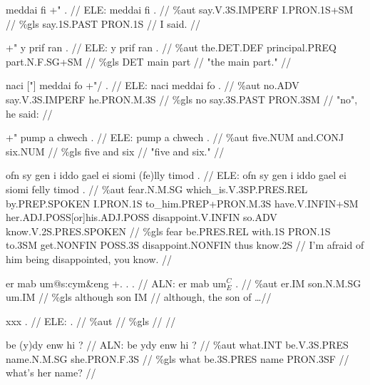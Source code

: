 \documentclass[a4paper,10pt]{article}
\begin{document}
\ex
\begingl[lingstyle=gergl]
\glchat meddai fi +" . //
\glsurface ELE:  meddai fi .  //
\glauto \%aut  say{\scriptsize .V.3S.IMPERF} I{\scriptsize .PRON.1S+SM}   //
\glmanual \%gls  say{\scriptsize .1S.PAST} PRON{\scriptsize .1S}   //
\gleng I said. //
\endgl
\xe

\ex
\begingl[lingstyle=gergl]
\glchat +" y prif ran . //
\glsurface ELE:  y prif ran .  //
\glauto \%aut  the{\scriptsize .DET.DEF} principal{\scriptsize .PREQ} part{\scriptsize .N.F.SG+SM}   //
\glmanual \%gls  DET main part   //
\gleng "the main part." //
\endgl
\xe

\ex
\begingl[lingstyle=gergl]
\glchat naci ["] meddai fo +"/ . //
\glsurface ELE:  naci meddai fo .  //
\glauto \%aut  no{\scriptsize .ADV} say{\scriptsize .V.3S.IMPERF} he{\scriptsize .PRON.M.3S}   //
\glmanual \%gls  no say{\scriptsize .3S.PAST} PRON{\scriptsize .3SM}   //
\gleng "no", he said: //
\endgl
\xe

\ex
\begingl[lingstyle=gergl]
\glchat +" pump a chwech . //
\glsurface ELE:  pump a chwech .  //
\glauto \%aut  five{\scriptsize .NUM} and{\scriptsize .CONJ} six{\scriptsize .NUM}   //
\glmanual \%gls  five and six   //
\gleng "five and six." //
\endgl
\xe

\ex
\begingl[lingstyle=gergl]
\glchat ofn sy gen i iddo gael ei siomi (fe)lly timod . //
\glsurface ELE:  ofn sy gen i iddo gael ei siomi felly timod .  //
\glauto \%aut  fear{\scriptsize .N.M.SG} which\_is{\scriptsize .V.3SP.PRES.REL} by{\scriptsize .PREP.SPOKEN} I{\scriptsize .PRON.1S} to\_him{\scriptsize .PREP+PRON.M.3S} have{\scriptsize .V.INFIN+SM} her{\scriptsize .ADJ.POSS[or]his.ADJ.POSS} disappoint{\scriptsize .V.INFIN} so{\scriptsize .ADV} know{\scriptsize .V.2S.PRES.SPOKEN}   //
\glmanual \%gls  fear be{\scriptsize .PRES.REL} with{\scriptsize .1S} PRON{\scriptsize .1S} to{\scriptsize .3SM} get{\scriptsize .NONFIN} POSS{\scriptsize .3S} disappoint{\scriptsize .NONFIN} thus know{\scriptsize .2S}   //
\gleng I'm afraid of him being disappointed, you know. //
\endgl
\xe

\ex
\begingl[lingstyle=gergl]
\glchat er mab um@s:cym\&eng +. . . //
\glsurface ALN:  er mab um$^{C}_{E}$ .  //
\glauto \%aut  er{\scriptsize .IM} son{\scriptsize .N.M.SG} um{\scriptsize .IM}   //
\glmanual \%gls  although son IM   //
\gleng although, the son of \dots  //
\endgl
\xe

\ex
\begingl[lingstyle=gergl]
\glchat xxx . //
\glsurface ELE:  .  //
\glauto \%aut    //
\glmanual \%gls    //
\gleng  //
\endgl
\xe

\ex
\begingl[lingstyle=gergl]
\glchat be (y)dy enw hi ? //
\glsurface ALN:  be ydy enw hi ?  //
\glauto \%aut  what{\scriptsize .INT} be{\scriptsize .V.3S.PRES} name{\scriptsize .N.M.SG} she{\scriptsize .PRON.F.3S}   //
\glmanual \%gls  what be{\scriptsize .3S.PRES} name PRON{\scriptsize .3SF}   //
\gleng what's her name? //
\endgl
\xe
\end{document}
